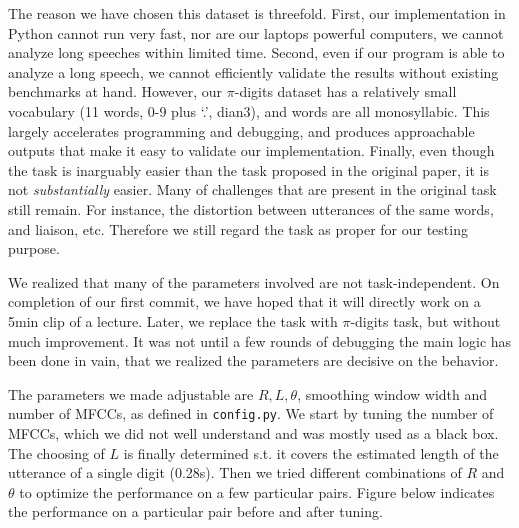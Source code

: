 \documentclass{article}
\begin{document}
    The reason we have chosen this dataset is threefold. First, our implementation in Python cannot run very 
    fast, nor are our laptops powerful computers, we cannot analyze long speeches within limited time. Second,
    even if our program is able to analyze a long speech, we cannot efficiently validate the results
    without existing benchmarks at hand. However, our $\pi$-digits dataset has a relatively small vocabulary
    (11 words, 0-9 plus `.', dian3), and words are all monosyllabic. This largely accelerates programming
    and debugging, and produces approachable outputs that make it easy to validate our implementation.
    Finally, even though the task is inarguably easier than the task proposed in the original paper, it 
    is not \emph{substantially} easier. Many of challenges that are present in the original task still remain.
    For instance, the distortion between utterances of the same words, and liaison, 
    etc. Therefore we still regard the task as proper for our testing purpose.

    We realized that many of the parameters involved are not task-independent. On completion of our first
    commit, we have hoped that it will directly work on a 5min clip of a lecture. Later, we replace the 
    task with $\pi$-digits task, but without much improvement. It was not until a few rounds of debugging 
    the main logic has been done in vain, that we realized the parameters are decisive on the behavior.

    The parameters we made adjustable are $R, L, \theta$, smoothing window width and number of MFCCs, 
    as defined in \texttt{config.py}.
    We start by tuning the number of MFCCs, which we did not well understand and was mostly used as 
    a black box. The choosing of $L$ is finally determined s.t. it covers the estimated length of the utterance 
    of a single digit (0.28s). Then we tried different combinations of $R$ and $\theta$ to optimize 
    the performance on a few particular pairs. Figure below indicates the performance on a particular pair
    before and after tuning.
\end{document}
